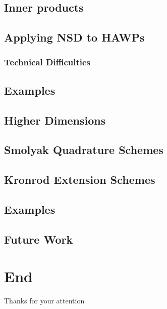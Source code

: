 \documentclass{beamer}
\begin{document}

\subsection{Inner products}



\subsection{Applying NSD to HAWPs}
\subsubsection{Technical Difficulties}



\subsection{Examples}




\subsection{Higher Dimensions}



\subsection{Smolyak Quadrature Schemes}



\subsection{Kronrod Extension Schemes}



\subsection{Examples}



\subsection{Future Work}



\section{End}

\begin{frame}{Thanks for your attention}
  \scriptsize
  
  
\end{frame}
\end{document}
